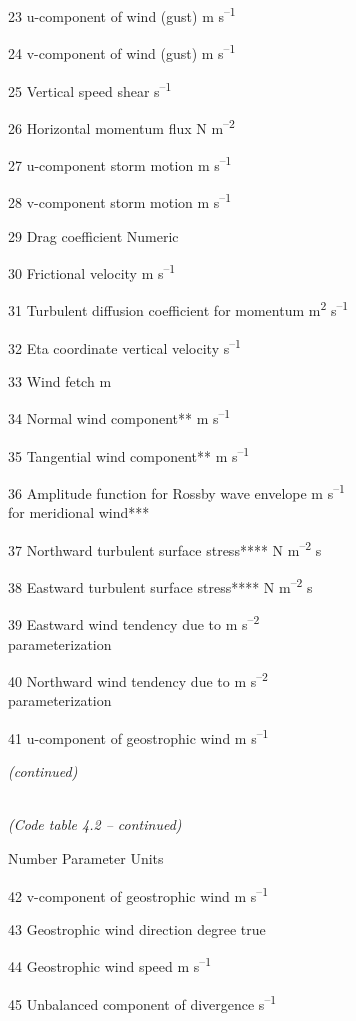 23 u-component of wind (gust) m s\textsuperscript{--1}

24 v-component of wind (gust) m s\textsuperscript{--1}

25 Vertical speed shear s\textsuperscript{--1}

26 Horizontal momentum flux N m\textsuperscript{--2}

27 u-component storm motion m s\textsuperscript{--1}

28 v-component storm motion m s\textsuperscript{--1}

29 Drag coefficient Numeric

30 Frictional velocity m s\textsuperscript{--1}

31 Turbulent diffusion coefficient for momentum m\textsuperscript{2} s\textsuperscript{--1}

32 Eta coordinate vertical velocity s\textsuperscript{--1}

33 Wind fetch m

34 Normal wind component** m s\textsuperscript{--1}

35 Tangential wind component** m s\textsuperscript{--1}

36 Amplitude function for Rossby wave envelope m s\textsuperscript{--1}\\
for meridional wind***

37 Northward turbulent surface stress**** N m\textsuperscript{--2} s

38 Eastward turbulent surface stress**** N m\textsuperscript{--2} s

39 Eastward wind tendency due to m s\textsuperscript{--2}\\
parameterization

40 Northward wind tendency due to m s\textsuperscript{--2}\\
parameterization

41 u-component of geostrophic wind m s\textsuperscript{--1}

\emph{(continued)}

\emph{\\
(Code table 4.2 -- continued)}

Number Parameter Units

42 v-component of geostrophic wind m s\textsuperscript{--1}

43 Geostrophic wind direction degree true

44 Geostrophic wind speed m s\textsuperscript{--1}

45 Unbalanced component of divergence s\textsuperscript{--1}

